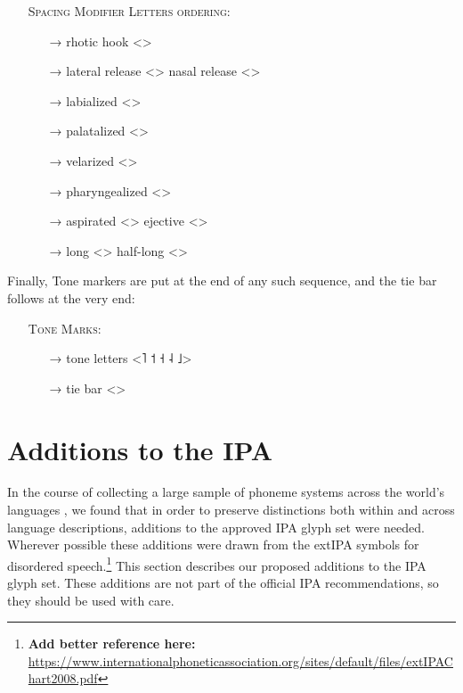 \begin{itemize}
	\item[] \textsc{Spacing Modifier Letters ordering:}
	\begin{itemize}
	  \item[→] rhotic hook <>
	  \item[→] lateral release <> \textbar{} nasal release <>
	  \item[→] labialized <>
	  \item[→] palatalized <>
	  \item[→] velarized <>
	  \item[→] pharyngealized <>
	  \item[→] aspirated <> \textbar{} ejective <>
	  \item[→] long <> \textbar{} half-long <>
	\end{itemize}
\end{itemize}

\noindent Finally, Tone markers are put at the end of any such sequence, and the 
tie bar follows at the very end:

\begin{itemize}
  \item[] \textsc{Tone Marks:}
  \begin{itemize}
    \item[→] tone letters <˥ ˦ ˧ ˨ ˩>
    \item[→] tie bar <>
  \end{itemize}
\end{itemize}

\section{Additions to the IPA}
\label{ipa-additions}

In the course of collecting a large sample of phoneme systems across the world's
languages \citep{Moran2012}, we found that in order to preserve distinctions
both within and across language descriptions, additions to the approved IPA
glyph set were needed. Wherever possible these additions were drawn from the
extIPA symbols for disordered
speech.\footnote{\textbf{Add better reference here: }\url{https://www.internationalphoneticassociation.org/sites/default/files/extIPAChart2008.pdf}}
This section describes our proposed additions to the IPA glyph set. These
additions are not part of the official IPA recommendations, so they should be 
used with care.

